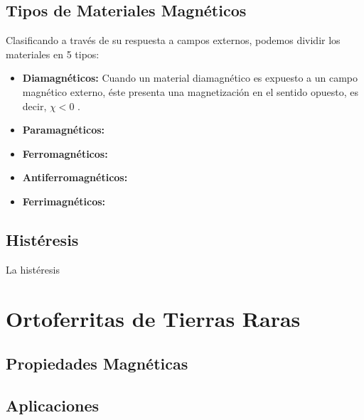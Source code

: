 \documentclass[../main.tex]{subfiles}
\begin{document}
\subsection{Tipos de Materiales Magnéticos}
Clasificando a través de su respuesta a campos externos, podemos dividir los materiales en 5 tipos:
\begin{itemize}
\item \textbf{Diamagnéticos:} Cuando un material diamagnético es expuesto a un campo magnético externo, éste presenta una magnetización en el sentido opuesto, es decir, $\chi<0$ \cite{griffiths2023introduction}.
\item \textbf{Paramagnéticos:}
\item \textbf{Ferromagnéticos:}
\item \textbf{Antiferromagnéticos:}
\item \textbf{Ferrimagnéticos:} 
\end{itemize}
\subsection{Histéresis}
La histéresis 
\section{Ortoferritas de Tierras Raras}

\subsection{Propiedades Magnéticas}

\subsection{Aplicaciones}
\end{document}
